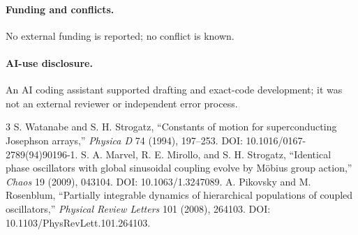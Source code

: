 \documentclass[8pt]{extarticle}
\begin{document}
\paragraph{Funding and conflicts.} No external funding is reported; no
conflict is known.
\paragraph{AI-use disclosure.} An AI coding assistant supported drafting and
exact-code development; it was not an external reviewer or independent error
process.

\begin{thebibliography}{3}
 S. Watanabe and S. H. Strogatz,
``Constants of motion for superconducting Josephson arrays,''
\emph{Physica D} 74 (1994), 197--253.
DOI: 10.1016/0167-2789(94)90196-1.
 S. A. Marvel, R. E. Mirollo, and S. H. Strogatz,
``Identical phase oscillators with global sinusoidal coupling evolve by
M\"obius group action,'' \emph{Chaos} 19 (2009), 043104.
DOI: 10.1063/1.3247089.
 A. Pikovsky and M. Rosenblum,
``Partially integrable dynamics of hierarchical populations of coupled
oscillators,'' \emph{Physical Review Letters} 101 (2008), 264103.
DOI: 10.1103/PhysRevLett.101.264103.
\end{thebibliography}
\end{document}
